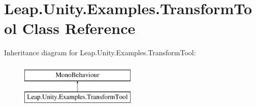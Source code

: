 \hypertarget{class_leap_1_1_unity_1_1_examples_1_1_transform_tool}{}\section{Leap.\+Unity.\+Examples.\+Transform\+Tool Class Reference}
\label{class_leap_1_1_unity_1_1_examples_1_1_transform_tool}
Inheritance diagram for Leap.\+Unity.\+Examples.\+Transform\+Tool\+:\begin{figure}[H]
\begin{center}
\leavevmode
\includegraphics[height=2.000000cm]{class_leap_1_1_unity_1_1_examples_1_1_transform_tool}
\end{center}
\end{figure}
